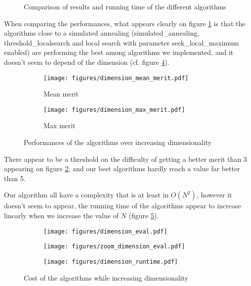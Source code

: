 \documentclass{article}
\begin{document}
    \begin{figure}[ht]
    \centering
    \caption{Comparison of results and running time of the different algorithms}
    \label{compare_points}
  \end{figure}

  When comparing the performances, what appears clearly on figure
  \ref{compare_points} is that the algorithms close to a simulated annealing
  (simulated\_annealing, threshold\_localsearch and local search with parameter
  seek\_local\_maximum enabled) are performing the best among algorithms we
  implemented, and it doesn't seem to depend of the dimension (cf. figure
  \ref{compare_merit}).

  \begin{figure}[H]
    \centering
    \begin{subfigure}[b]{0.49\textwidth}
      \centering
      \texttt{[image: figures/dimension\_mean\_merit.pdf]}
      \caption{Mean merit}
        \label{compare_merit_mean}
    \end{subfigure}
    \begin{subfigure}[b]{0.49\textwidth}
      \centering
      \texttt{[image: figures/dimension\_max\_merit.pdf]}
      \caption{Max merit}
        \label{compare_merit_max}
    \end{subfigure}
    \caption{Performances of the algorithms over increasing dimensionality}
    \label{compare_merit}
  \end{figure}


  There appear to be a threshold on the difficulty of getting a better merit
  than 3 appearing on figure \ref{compare_merit_mean}, and our best algorithms
  hardly reach a value far better than 5.

  Our algorithm all have a complexity that is at least in $O(N^2)$, however it
  doesn't seem to appear, the running time of the algorithms appear to increase
  linearly when we increase the value of $N$ (figure \ref{compare_runtime}).

  \begin{figure}[H]
    \centering
    \begin{subfigure}[t]{0.35\textwidth}
      \vfil
      \centering
      \texttt{[image: figures/dimension\_eval.pdf]}
    \end{subfigure}
    \begin{subfigure}[t]{0.35\textwidth}
      \vfil
      \centering
      \texttt{[image: figures/zoom\_dimension\_eval.pdf]}
    \end{subfigure}
    \begin{subfigure}[t]{0.35\textwidth}
      \centering
      \texttt{[image: figures/dimension\_runtime.pdf]}
    \end{subfigure}
    \caption{Cost of the algorithms while increasing dimensionality}
    \label{compare_runtime}
  \end{figure}
\end{document}
